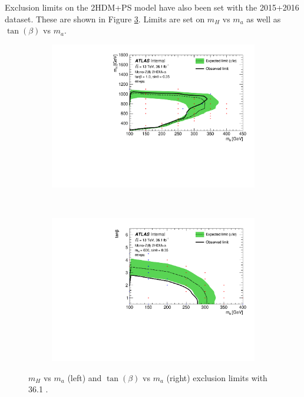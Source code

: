 Exclusion limits on the 2HDM+PS model have also been set with the 2015+2016 dataset. These are shown in Figure \ref{fig:2hdma}. Limits are set on $m_H$ vs $m_a$ as well as $\tan(\beta)$ vs $m_a$.

\begin{figure}[htb]
    \centering
    \begin{subfigure}[b]{0.48\textwidth}
        \includegraphics[width=\textwidth]{Figures/limits_2hdma.pdf}
        \label{fig:limits_2hdma}
    \end{subfigure}
    ~ %
    \begin{subfigure}[b]{0.48\textwidth}
        \includegraphics[width=\textwidth]{Figures/limits_2hdma_tan.pdf}
        \label{fig:limits_2hdma_tan}
    \end{subfigure}
    \caption{$m_H$ vs $m_a$ (left) and $\tan(\beta)$ vs $m_a$ (right) exclusion limits with 36.1 \ifb.}
\label{fig:2hdma}
\end{figure}

